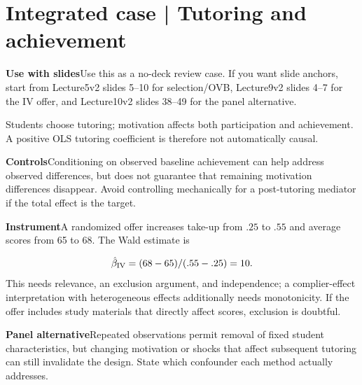 \documentclass[11pt,a4paper]{article}
\newcommand{\heading}[1]{\section*{\color{accent}#1}}
\newcommand{\cue}[2]{\par\noindent\textbf{#1}\quad #2\par}
\begin{document}
\heading{Integrated case | Tutoring and achievement}
\cue{Use with slides}{Use this as a no-deck review case. If you want slide anchors, start from Lecture5v2 slides 5--10 for selection/OVB, Lecture9v2 slides 4--7 for the IV offer, and Lecture10v2 slides 38--49 for the panel alternative.}
Students choose tutoring; motivation affects both participation and achievement. A positive OLS tutoring coefficient is therefore not automatically causal.
\cue{Controls}{Conditioning on observed baseline achievement can help address observed differences, but does not guarantee that remaining motivation differences disappear. Avoid controlling mechanically for a post-tutoring mediator if the total effect is the target.}
\cue{Instrument}{A randomized offer increases take-up from $.25$ to $.55$ and average scores from 65 to 68. The Wald estimate is}
\[
\hat\beta_{\rm IV}=(68-65)/(.55-.25)=10.
\]
This needs relevance, an exclusion argument, and independence; a complier-effect interpretation with heterogeneous effects additionally needs monotonicity. If the offer includes study materials that directly affect scores, exclusion is doubtful.
\cue{Panel alternative}{Repeated observations permit removal of fixed student characteristics, but changing motivation or shocks that affect subsequent tutoring can still invalidate the design. State which confounder each method actually addresses.}
\end{document}
